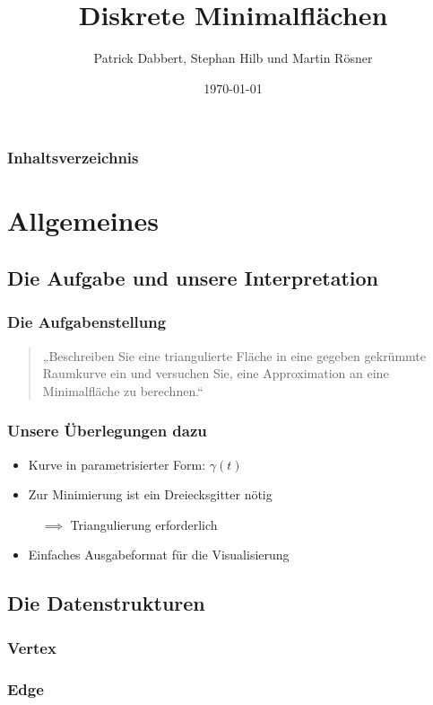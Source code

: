 \documentclass{beamer}
\title{Diskrete Minimalflächen}
\author{Patrick Dabbert, Stephan Hilb und Martin Rösner}
\date{\today}
\begin{document}
\begin{frame}
	\titlepage
\end{frame}

\begin{frame}
	\frametitle{Inhaltsverzeichnis}
	\tableofcontents[currentsection]
\end{frame}

\section{Allgemeines}

\subsection{Die Aufgabe und unsere Interpretation}

\begin{frame}
	\frametitle{Die Aufgabenstellung}
	\begin{quote}
		„Beschreiben Sie eine triangulierte Fläche in eine gegeben gekrümmte Raumkurve ein und versuchen Sie, eine Approximation an eine Minimalfläche zu berechnen.“
	\end{quote}
\end{frame}

\begin{frame}
	\frametitle{Unsere Überlegungen dazu}
	\begin{itemize}
		\item
			Kurve in parametrisierter Form: $\gamma(t)$
		\item
			Zur Minimierung ist ein Dreiecksgitter nötig
			
			$\quad \implies$ Triangulierung erforderlich
		\item
			Einfaches Ausgabeformat für die Visualisierung
	\end{itemize}
\end{frame}

\subsection{Die Datenstrukturen}

\begin{frame}
	\frametitle{Vertex}
	
\end{frame}

\begin{frame}
	\frametitle{Edge}
	
\end{frame}
\end{document}
